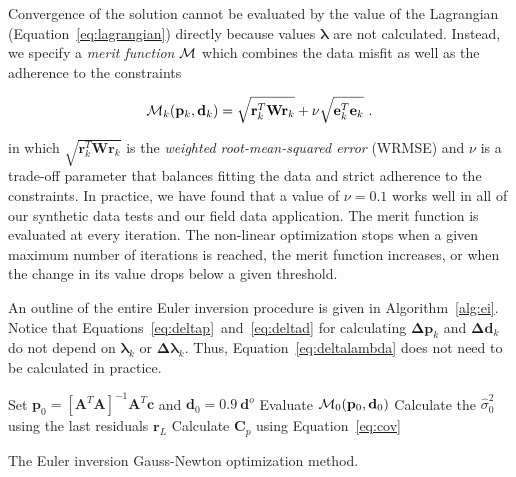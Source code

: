 Convergence of the solution cannot be evaluated by the value of the Lagrangian
(Equation~\ref{eq:lagrangian}) directly because values $\boldsymbol{\lambda}$ are
not calculated.
Instead, we specify a \textit{merit function} $\operatorname{\mathcal{M}}$ which combines the data
misfit as well as the adherence to the constraints

\begin{equation}
  \operatorname{\mathcal{M}}_k(\mathbf{p}_k, \mathbf{d}_k) =
  \sqrt{\mathbf{r}_k^T\mathbf{W}\mathbf{r}_k}
  + \nu\sqrt{\mathbf{e}_k^T\mathbf{e}_k}
  \ .
  \label{eq:merit}
\end{equation}

\noindent
in which $\sqrt{\mathbf{r}_k^T\mathbf{W}\mathbf{r}_k}$ is the
\textit{weighted root-mean-squared error} (WRMSE) and
$\nu$ is a trade-off parameter that balances fitting the data and strict adherence
to the constraints.
In practice, we have found that a value of $\nu=0.1$ works well in all of our
synthetic data tests and our field data application.
The merit function is evaluated at every iteration.
The non-linear optimization stops when a given maximum number of iterations is
reached, the merit function increases, or when the change in its value drops
below a given threshold.

An outline of the entire Euler inversion procedure is given in
Algorithm~\ref{alg:ei}.
Notice that Equations~\ref{eq:deltap}~and~\ref{eq:deltad} for calculating
$\mathbf{\Delta p}_k$ and $\mathbf{\Delta d}_k$ do not depend on
$\boldsymbol{\lambda}_k$ or $\boldsymbol{\Delta\lambda}_k$.
Thus, Equation~\ref{eq:deltalambda} does not need to be calculated in practice.

\begin{algorithm}[!h]
  Set
  $\mathbf{p}_0 = \left[\mathbf{A}^T\mathbf{A}\right]^{-1}\mathbf{A}^T\mathbf{c}$
  and $\mathbf{d}_0 = 0.9\ \mathbf{d}^o$
  \;
  Evaluate $\operatorname{\mathcal{M}}_0(\mathbf{p}_0, \mathbf{d}_0)$
  \;
  Calculate the $\hat{\sigma}_0^2$ using the last residuals $\mathbf{r}_L$
  \;
  Calculate $\mathbf{C}_p$ using Equation~\ref{eq:cov}
  \;
  \BlankLine
  \caption{The Euler inversion Gauss-Newton optimization method.}
  \label{alg:ei}
\end{algorithm}

